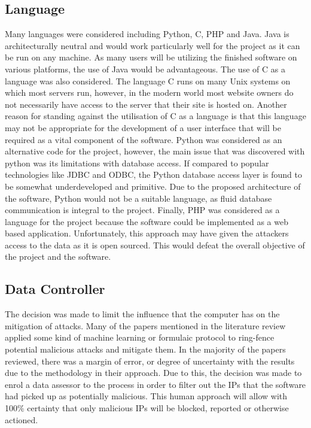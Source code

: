 \subsection*{Language} \label{Language}
Many languages were considered including Python, C, PHP and Java. Java is architecturally neutral and would work particularly well for the project as it can be run on any machine. As many users will be utilizing the finished software on various platforms, the use of Java would be advantageous. The use of C as a language was also considered. The language C runs on many Unix systems on which most servers run, however, in the modern world most website owners do not necessarily have access to the server that their site is hosted on. Another reason for standing against the utilisation of C as a language is that this language may not be appropriate for the development of a user interface that will be required as a vital component of the software. Python was considered as an alternative code for the project, however, the main issue that was discovered with python was its limitations with database access. If compared to popular technologies like JDBC and ODBC, the Python database access layer is found to be somewhat underdeveloped and primitive. Due to the proposed architecture of the software, Python would not be a suitable language, as fluid database communication is integral to the project. Finally, PHP was considered as a language for the project because the software could be implemented as a web based application. Unfortunately, this approach may have given the attackers access to the data as it is open sourced. This would defeat the overall objective of the project and the software.  

\subsection*{Data Controller}
The decision was made to limit the influence that the computer has on the mitigation of attacks. Many of the papers mentioned in the literature review applied some kind of machine learning or formulaic protocol to ring-fence potential malicious attacks and mitigate them. In the majority of the papers reviewed, there was a margin of error, or degree of uncertainty with the results due to the methodology in their approach. Due to this, the decision was made to enrol a data assessor to the process in order to filter out the IPs that the software had picked up as potentially malicious. This human approach will allow with 100\% certainty that only malicious IPs will be blocked, reported or otherwise actioned. 